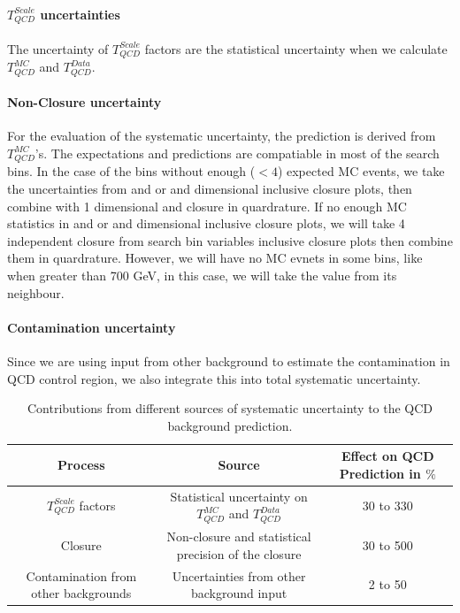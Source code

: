 \paragraph{$T_{QCD}^{Scale}$ uncertainties}
The uncertainty of $T_{QCD}^{Scale}$ factors are the statistical uncertainty when we calculate $T_{QCD}^{MC}$ and $T_{QCD}^{Data}$.

\paragraph{Non-Closure uncertainty}

For the evaluation of the systematic uncertainty, the prediction is 
derived from $T_{QCD}^{MC}$'s. 
The expectations and predictions are compatiable in 
most of the search bins. In the case of the bins without enough ($<4$) expected MC events,
we take the uncertainties from \MET and  \MTTwo or \MET and   dimensional inclusive closure plots, then combine with 1 dimensional \ntops and \nbjets closure in quardrature. If no enough MC statistics in \MET and  \MTTwo or \MET and   dimensional inclusive closure plots, we will take 4 independent closure from search bin variables inclusive closure plots then combine them in quardrature. However, we will have no MC evnets in some bins, like when \MET greater than 700 GeV, in this case, we will take the value from its neighbour. 

\paragraph{Contamination uncertainty}
Since we are using input from other background to estimate the contamination in QCD control region, we also integrate this into total systematic uncertainty.

\begin{table}[htbp]
\fontsize{10 pt}{1.2 em}
\selectfont
\begin{centering}
\caption{\label{tab:QCDpredsys} Contributions from different
sources of systematic uncertainty to the QCD background prediction.}
\hspace*{-4ex}
\begin{tabular}{|c|c|c|}
\hline
Process & Source & Effect on QCD Prediction in $\%$\\
\hline
$T_{QCD}^{Scale}$ factors & Statistical uncertainty on $T_{QCD}^{MC}$ and $T_{QCD}^{Data}$ & 30 to 330 \\
\hline
Closure & Non-closure and statistical precision of the closure & 30 to 500 \\
\hline
Contamination from other backgrounds & Uncertainties from other background input & 2 to 50 \\
\hline
\end{tabular}
\par\end{centering}
\end{table}


